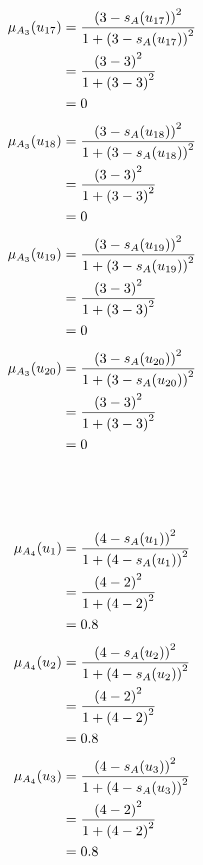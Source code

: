 \documentclass[a4paper]{book}
\begin{document}
				\begin{align}
					\mu_{A_3}(u_{17}) &= \frac{\left(3-s_A(u_{17})\right)^2}{1 + \left(3-s_A(u_{17})\right)^2}\\
					&= \frac{\left(3-3\right)^2}{1 + \left(3-3\right)^2} \notag \\
					&= 0 \notag
				\end{align}
				\begin{align}
					\mu_{A_3}(u_{18}) &= \frac{\left(3-s_A(u_{18})\right)^2}{1 + \left(3-s_A(u_{18})\right)^2}\\
					&= \frac{\left(3-3\right)^2}{1 + \left(3-3\right)^2} \notag \\
					&= 0 \notag
				\end{align}
				\begin{align}
					\mu_{A_3}(u_{19}) &= \frac{\left(3-s_A(u_{19})\right)^2}{1 + \left(3-s_A(u_{19})\right)^2}\\
					&= \frac{\left(3-3\right)^2}{1 + \left(3-3\right)^2} \notag \\
					&= 0 \notag
				\end{align}
				\begin{align}
					\mu_{A_3}(u_{20}) &= \frac{\left(3-s_A(u_{20})\right)^2}{1 + \left(3-s_A(u_{20})\right)^2}\\
					&= \frac{\left(3-3\right)^2}{1 + \left(3-3\right)^2} \notag \\
					&= 0 \notag
				\end{align}
				\\
				\\
				\\
				\begin{align}
					\mu_{A_4}(u_1) &= \frac{\left(4-s_A(u_1)\right)^2}{1 + \left(4-s_A(u_1)\right)^2}\\
					&= \frac{\left(4-2\right)^2}{1 + \left(4-2\right)^2} \notag \\
					&= 0.8 \notag
				\end{align}
				\begin{align}
					\mu_{A_4}(u_2) &= \frac{\left(4-s_A(u_2)\right)^2}{1 + \left(4-s_A(u_2)\right)^2}\\
					&= \frac{\left(4-2\right)^2}{1 + \left(4-2\right)^2} \notag \\
					&= 0.8 \notag
				\end{align}
				\begin{align}
					\mu_{A_4}(u_3) &= \frac{\left(4-s_A(u_3)\right)^2}{1 + \left(4-s_A(u_3)\right)^2}\\
					&= \frac{\left(4-2\right)^2}{1 + \left(4-2\right)^2} \notag \\
					&= 0.8 \notag
				\end{align}
\end{document}
